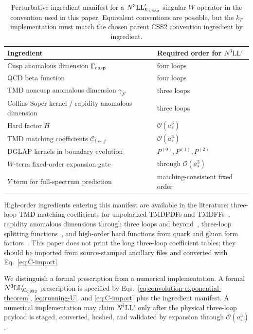 \documentclass[aps,prd,preprint,superscriptaddress,nofootinbib,longbibliography]{revtex4-2}
\newcommand{\KCSS}{\mathcal K_{\rm CSS2}}
\newcommand{\NthreeLLp}{N^3\mathrm{LL}'}
\newcommand{\order}[1]{\mathcal O\!\left(#1\right)}
\begin{document}
\begin{table}[t]
\caption{Perturbative ingredient manifest for a $\NthreeLLp_{\KCSS}$ singular $W$ operator in the convention used in this paper.  Equivalent conventions are possible, but the $k_T$ implementation must match the chosen parent CSS2 convention ingredient by ingredient.}
\label{tab:ingredients}
\begin{ruledtabular}
\begin{tabular}{ll}
Ingredient & Required order for $\NthreeLLp$ \\
\hline
Cusp anomalous dimension $\Gamma_{\rm cusp}$ & four loops \\
QCD beta function & four loops \\
TMD noncusp anomalous dimension $\gamma_F$ & three loops \\
Collins-Soper kernel / rapidity anomalous dimension & three loops \\
Hard factor $H$ & $\order{a_s^3}$ \\
TMD matching coefficients $\mathcal C_{i\leftarrow j}$ & $\order{a_s^3}$ \\
DGLAP kernels in boundary evolution & $P^{(0)},P^{(1)},P^{(2)}$ \\
$W$-term fixed-order expansion gate & through $\order{a_s^3}$ \\
$Y$ term for full-spectrum prediction & matching-consistent fixed order \\
\end{tabular}
\end{ruledtabular}
\end{table}

High-order ingredients entering this manifest are available in the literature: three-loop TMD matching coefficients for unpolarized TMDPDFs and TMDFFs~\cite{EbertMistlbergerVita2020,EbertMistlbergerVita2021FF,LuoYangZhuZhu2021}, rapidity anomalous dimensions through three loops and beyond~\cite{LiZhu2017,MoultZhuZhu2022,DuhrMistlbergerVita2022}, three-loop splitting functions~\cite{MochVermaserenVogt2004,VogtMochVermaseren2004}, and high-order hard functions from quark and gluon form factors~\cite{GehrmannGloverHuberIkizlerliStuderus2010}.  This paper does not print the long three-loop coefficient tables; they should be imported from source-stamped ancillary files and converted with Eq.~\eqref{eq:C-import}.

We distinguish a formal prescription from a numerical implementation.  A formal $\NthreeLLp_{\KCSS}$ prescription is specified by Eqs.~\eqref{eq:convolution-exponential-theorem}, \eqref{eq:running-U}, and \eqref{eq:C-import} plus the ingredient manifest.  A numerical implementation may claim $\NthreeLLp$ only after the physical three-loop payload is staged, converted, hashed, and validated by expansion through $\order{a_s^3}$.
\end{document}
